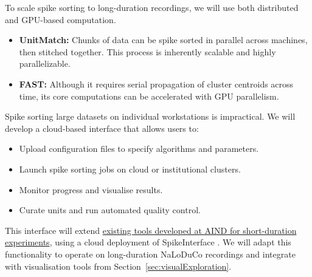 \label{sec:offlineMethodsScaling}

To scale spike sorting to long-duration recordings, we will use both distributed and GPU-based computation.

\begin{itemize}
    \item \textbf{UnitMatch:} Chunks of data can be spike sorted in parallel across machines, then stitched together. This process is inherently scalable and highly parallelizable.
    \item \textbf{FAST:} Although it requires serial propagation of cluster centroids across time, its core computations can be accelerated with GPU parallelism.
\end{itemize}

\label{sec:offlineMethodsCloud}

Spike sorting large datasets on individual workstations is impractical. We will develop a cloud-based interface that allows users to:

\begin{itemize}
    \item Upload configuration files to specify algorithms and parameters.
    \item Launch spike sorting jobs on cloud or institutional clusters.
    \item Monitor progress and visualise results.
    \item Curate units and run automated quality control.
\end{itemize}

This interface will extend
\href{https://www.youtube.com/watch?v=F652nwcdYSE&list=PLQVnU1OJzOn_mFlUL8aWQym4HfVvhlrGE&index=28&t=20s}{existing
tools developed at AIND for short-duration experiments}, using a cloud
deployment of SpikeInterface \citep{buccinoEtAl20}. We will adapt this
functionality to operate on long-duration NaLoDuCo recordings and integrate
with visualisation tools from Section~\ref{sec:visualExploration}.

\label{sec:offlineQC}


